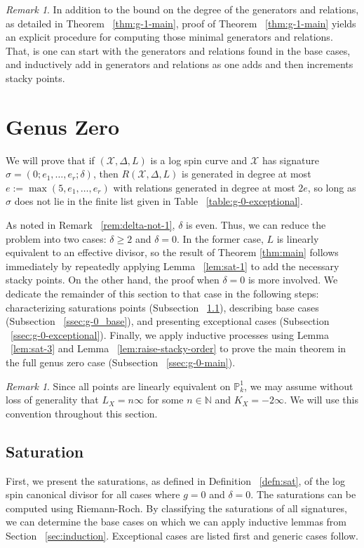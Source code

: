 \documentclass{amsart}
\theoremstyle{plain}
\theoremstyle{definition}
\theoremstyle{remark}
\newtheorem{rem}[thm]{Remark}
\numberwithin{equation}{section}
\newcommand\ssec{\subsection}
\newcommand\BN{{\mathbb N}}
\newcommand\BP{{\mathbb P}}
\newcommand\sx{\mathscr X}
\newcommand{\halfcan}{L}
\begin{document}
\begin{rem}
In addition to the bound on the degree of the generators and relations, as detailed in Theorem ~\ref{thm:g-1-main}, proof of Theorem ~\ref{thm:g-1-main} yields an explicit procedure for computing those minimal generators and relations. That, is one can start with the generators and relations found in the base cases, and inductively add in generators and relations as one adds and then increments stacky points.
\end{rem}


\section{Genus Zero}
\label{sec:g-0}
We will prove that if $(\sx, \Delta, \halfcan)$ is a log spin
curve and $\sx$ has signature $\sigma = (0; e_1, \ldots, e_r;
\delta)$, then $R(\sx, \Delta, L)$ is generated in degree at most
$e := \max(5, e_1, \ldots, e_r)$ with relations generated in degree
at most $2e$, so long as $\sigma$ does not lie in the finite list
given in Table ~\ref{table:g-0-exceptional}.

As noted in Remark ~\ref{rem:delta-not-1}, $\delta$ is even. Thus,
we can reduce the problem into two cases: $\delta \geq 2$ and
$\delta = 0$. In the former case, $\halfcan$ is linearly equivalent
to an effective divisor, so the result of Theorem \ref{thm:main}
follows immediately by repeatedly applying Lemma ~\ref{lem:sat-1}
to add the necessary stacky points. On the other hand, the proof
when $\delta = 0$ is more involved. We dedicate the remainder of
this section to that case in the following steps: characterizing
saturations points (Subsection ~\ref{ssec:g-0_saturation}),
describing base cases (Subsection ~\ref{ssec:g-0_base}), and
presenting exceptional cases (Subsection ~\ref{ssec:g-0-exceptional}).
Finally, we apply inductive processes using Lemma ~\ref{lem:sat-3}
and Lemma ~\ref{lem:raise-stacky-order} to prove the main theorem
in the full genus zero case (Subsection ~\ref{ssec:g-0-main}).
 
\begin{rem}
Since all points are linearly equivalent on $\BP^1_k$, we may
assume without loss of generality that $L_X = n \infty$ for some $n
\in \BN$ and $K_X = -2 \infty$. We will use this convention
throughout this section.
\end{rem}

\ssec{Saturation}
\label{ssec:g-0_saturation}
First, we present the saturations, as defined in Definition
~\ref{defn:sat}, of the log spin canonical divisor for
all cases where $g = 0$ and $\delta = 0$. The saturations can be computed using Riemann-Roch.
By classifying the saturations of all signatures, we can determine
the base cases on which we can apply inductive lemmas from
Section ~\ref{sec:induction}. Exceptional cases are listed first
and generic cases follow.
\end{document}
